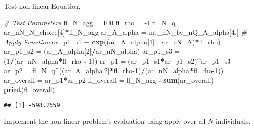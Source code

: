 \documentclass[
]{book}
\newenvironment{Shaded}{\begin{snugshade}}{\end{snugshade}}
\newcommand{\CommentTok}[1]{\textcolor[rgb]{0.56,0.35,0.01}{\textit{#1}}}
\newcommand{\DecValTok}[1]{\textcolor[rgb]{0.00,0.00,0.81}{#1}}
\newcommand{\KeywordTok}[1]{\textcolor[rgb]{0.13,0.29,0.53}{\textbf{#1}}}
\newcommand{\NormalTok}[1]{#1}
\newcommand{\OperatorTok}[1]{\textcolor[rgb]{0.81,0.36,0.00}{\textbf{#1}}}
\newcommand{\StringTok}[1]{\textcolor[rgb]{0.31,0.60,0.02}{#1}}
\begin{document}
Test non-linear Equation.

\begin{Shaded}
\begin{Highlighting}[]
\CommentTok{# Test Parameters}
\NormalTok{fl_N_agg =}\StringTok{ }\DecValTok{100}
\NormalTok{fl_rho =}\StringTok{ }\DecValTok{-1}
\NormalTok{fl_N_q =}\StringTok{ }\NormalTok{ar_nN_N_choice[}\DecValTok{4}\NormalTok{]}\OperatorTok{*}\NormalTok{fl_N_agg}
\NormalTok{ar_A_alpha =}\StringTok{ }\NormalTok{mt_nN_by_nQ_A_alpha[}\DecValTok{4}\NormalTok{,]}
\CommentTok{# Apply Function}
\NormalTok{ar_p1_s1 =}\StringTok{ }\KeywordTok{exp}\NormalTok{((ar_A_alpha[}\DecValTok{1}\NormalTok{] }\OperatorTok{-}\StringTok{ }\NormalTok{ar_nN_A)}\OperatorTok{*}\NormalTok{fl_rho)}
\NormalTok{ar_p1_s2 =}\StringTok{ }\NormalTok{(ar_A_alpha[}\DecValTok{2}\NormalTok{]}\OperatorTok{/}\NormalTok{ar_nN_alpha)}
\NormalTok{ar_p1_s3 =}\StringTok{ }\NormalTok{(}\DecValTok{1}\OperatorTok{/}\NormalTok{(ar_nN_alpha}\OperatorTok{*}\NormalTok{fl_rho }\OperatorTok{-}\StringTok{ }\DecValTok{1}\NormalTok{))}
\NormalTok{ar_p1 =}\StringTok{ }\NormalTok{(ar_p1_s1}\OperatorTok{*}\NormalTok{ar_p1_s2)}\OperatorTok{^}\NormalTok{ar_p1_s3}
\NormalTok{ar_p2 =}\StringTok{ }\NormalTok{fl_N_q}\OperatorTok{^}\NormalTok{((ar_A_alpha[}\DecValTok{2}\NormalTok{]}\OperatorTok{*}\NormalTok{fl_rho}\DecValTok{-1}\NormalTok{)}\OperatorTok{/}\NormalTok{(ar_nN_alpha}\OperatorTok{*}\NormalTok{fl_rho}\DecValTok{-1}\NormalTok{))}
\NormalTok{ar_overall =}\StringTok{ }\NormalTok{ar_p1}\OperatorTok{*}\NormalTok{ar_p2}
\NormalTok{fl_overall =}\StringTok{ }\NormalTok{fl_N_agg }\OperatorTok{-}\StringTok{ }\KeywordTok{sum}\NormalTok{(ar_overall)}
\KeywordTok{print}\NormalTok{(fl_overall)}
\end{Highlighting}
\end{Shaded}

\begin{verbatim}
## [1] -598.2559
\end{verbatim}

Implement the non-linear problem's evaluation using apply over all \(N\) individuals.
\end{document}
